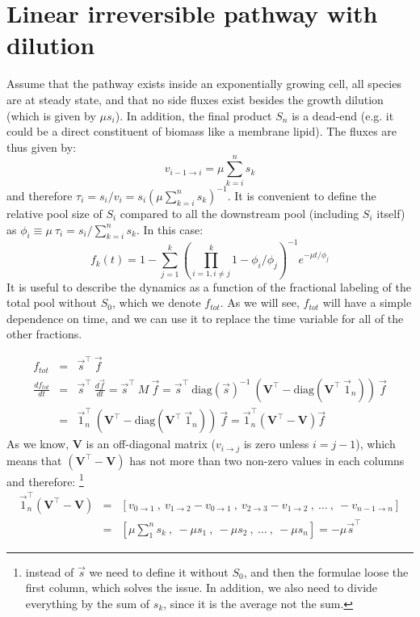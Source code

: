 \documentclass{article}
\newcommand{\flux}[2]{\ensuremath{v_{{#1} \rightarrow {#2}}}}
\begin{document}
\section{Linear irreversible pathway with dilution}\label{sec:linear_examples}
Assume that the pathway exists inside an exponentially growing cell, all species are at steady state, and that no side fluxes exist besides the growth dilution (which is given by $\mu s_i$). In addition, the final product $S_n$ is a dead-end (e.g. it could be a direct constituent of biomass like a membrane lipid). The fluxes are thus given by:
\begin{equation}
    \flux{i-1}{i} = \mu \sum_{k=i}^n s_k
\end{equation}
and therefore $\tau_i = s_i/v_i = s_i (\mu \sum_{k=i}^n s_k)^{-1}$. It is convenient to define the relative pool size of $S_i$ compared to all the downstream pool (including $S_i$ itself) as $\phi_i \equiv \mu~\tau_i = s_i / \sum_{k=i}^n s_k$. In this case:
\begin{equation}\label{eq:dilution}
    f_k(t) = 1 - \sum_{j=1}^{k} \left(\prod_{i = 1, i \neq j}^{k} 1 - \phi_i/\phi_j\right)^{-1} e^{- \mu t / \phi_j}
\end{equation}
It is useful to describe the dynamics as a function of the fractional labeling of the total pool without $S_0$, which we denote $f_{tot}$. As we will see, $f_{tot}$ will have a simple dependence on time, and we can use it to replace the time variable for all of the other fractions.

\begin{eqnarray}
	f_{tot} &=& \vec{s}^\top ~ \vec{f} \\
	\frac{d f_{tot}}{dt} &=& 
	 \vec{s}^\top ~ \frac{d\vec{f}}{dt} =
	 \vec{s}^\top ~ M ~ \vec{f} = 
	 \vec{s}^\top ~ \text{diag}(\vec{s})^{-1} ~ \left( \mathbf{V}^\top - \text{diag}(\mathbf{V}^\top~\vec{1}_n) \right) ~ \vec{f} \nonumber\\
	 &=& \vec{1}_n^\top~\left( \mathbf{V}^\top - \text{diag}(\mathbf{V}^\top~\vec{1}_n) \right) ~ \vec{f} = 
	 \vec{1}_n^\top \left(\mathbf{V}^\top - \mathbf{V} \right) \vec{f}
\end{eqnarray}
As we know, $\mathbf{V}$ is an off-diagonal matrix (\flux{i}{j} is zero unless $i = j-1$), which means that $\left(\mathbf{V}^\top - \mathbf{V} \right)$ has not more than two non-zero values in each columns and therefore: \footnote{instead of $\vec{s}$ we need to define it without $S_0$, and then the formulae loose the first column, which solves the issue. In addition, we also need to divide everything by the sum of $s_k$, since it is the average not the sum.}
\begin{eqnarray}
	\vec{1}_n^\top \left(\mathbf{V}^\top - \mathbf{V} \right) &=& \left[\flux{0}{1}~,~ \flux{1}{2}-\flux{0}{1} ~,~ \flux{2}{3}-\flux{1}{2} ~,~ \ldots~,~ -\flux{n-1}{n} \right] \nonumber\\
	&=& \left[ \mu \sum_1^n{s_k} ~,~ -\mu s_1 ~,~ -\mu s_2 ~,~ \ldots ~,~ -\mu s_n \right] = -\mu \vec{s}^\top
\end{eqnarray}
\end{document}
